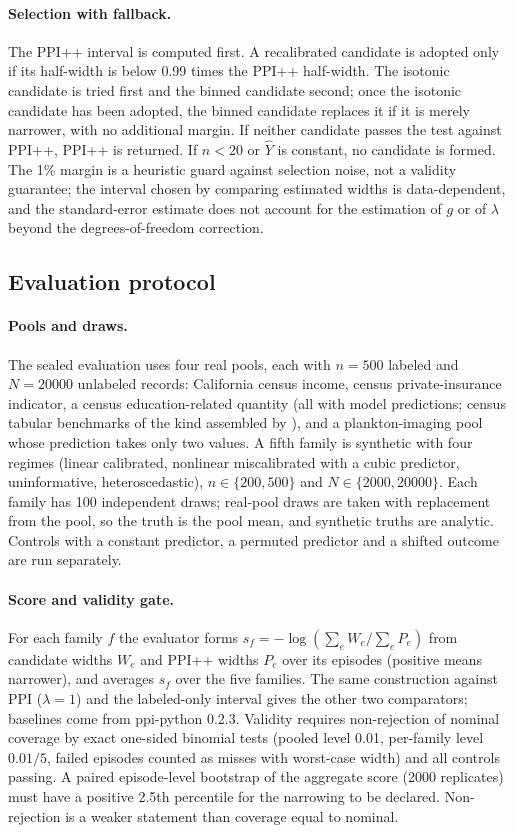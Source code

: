 \documentclass{article}
\newcommand{\Yhat}{\hat Y}
\begin{document}
\paragraph{Selection with fallback.} The PPI++ interval is computed first. A recalibrated candidate is adopted only if its half-width is below 0.99 times the PPI++ half-width. The isotonic candidate is tried first and the binned candidate second; once the isotonic candidate has been adopted, the binned candidate replaces it if it is merely narrower, with no additional margin. If neither candidate passes the test against PPI++, PPI++ is returned. If $n<20$ or $\Yhat$ is constant, no candidate is formed. The 1\% margin is a heuristic guard against selection noise, not a validity guarantee; the interval chosen by comparing estimated widths is data-dependent, and the standard-error estimate does not account for the estimation of $g$ or of $\lambda$ beyond the degrees-of-freedom correction.

\subsection{Evaluation protocol}
\paragraph{Pools and draws.} The sealed evaluation uses four real pools, each with $n=500$ labeled and $N=20000$ unlabeled records: California census income, census private-insurance indicator, a census education-related quantity (all with model predictions; census tabular benchmarks of the kind assembled by \citealt{Ding2021RetiringAN}), and a plankton-imaging pool whose prediction takes only two values. A fifth family is synthetic with four regimes (linear calibrated, nonlinear miscalibrated with a cubic predictor, uninformative, heteroscedastic), $n\in\{200,500\}$ and $N\in\{2000,20000\}$. Each family has 100 independent draws; real-pool draws are taken with replacement from the pool, so the truth is the pool mean, and synthetic truths are analytic. Controls with a constant predictor, a permuted predictor and a shifted outcome are run separately.

\paragraph{Score and validity gate.} For each family $f$ the evaluator forms $s_f=-\log(\sum_e W_e/\sum_e P_e)$ from candidate widths $W_e$ and PPI++ widths $P_e$ over its episodes (positive means narrower), and averages $s_f$ over the five families. The same construction against PPI ($\lambda{=}1$) and the labeled-only interval gives the other two comparators; baselines come from ppi-python 0.2.3. Validity requires non-rejection of nominal coverage by exact one-sided binomial tests (pooled level 0.01, per-family level $0.01/5$, failed episodes counted as misses with worst-case width) and all controls passing. A paired episode-level bootstrap of the aggregate score (2000 replicates) must have a positive 2.5th percentile for the narrowing to be declared. Non-rejection is a weaker statement than coverage equal to nominal.
\end{document}

